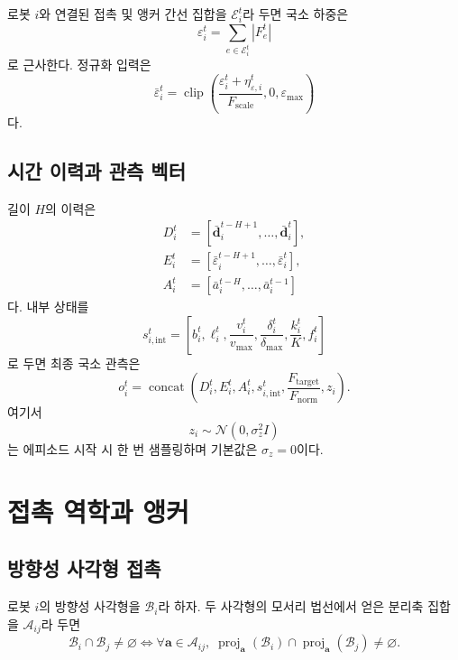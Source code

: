 \documentclass[11pt,a4paper]{article}
\newcommand{\Ftarget}{F_{\mathrm{target}}}
\newcommand{\clip}{\operatorname{clip}}
\newcommand{\concat}{\operatorname{concat}}
\begin{document}
로봇 \(i\)와 연결된 접촉 및 앵커 간선 집합을
\(\mathcal{E}_i^t\)라 두면 국소 하중은
\begin{equation}
  \varepsilon_i^t=
  \sum_{e\in\mathcal{E}_i^t}|F_e^t|
\end{equation}
로 근사한다. 정규화 입력은
\begin{equation}
  \bar\varepsilon_i^t=
  \clip\!\left(
    \frac{\varepsilon_i^t+\eta_{\varepsilon,i}^t}
         {F_{\mathrm{scale}}},
    0,\varepsilon_{\max}
  \right)
\end{equation}
다.

\subsection{시간 이력과 관측 벡터}

길이 \(H\)의 이력은
\begin{align}
  D_i^t &=
  [\bar{\bm d}_i^{t-H+1},\ldots,\bar{\bm d}_i^t],\\
  E_i^t &=
  [\bar\varepsilon_i^{t-H+1},\ldots,\bar\varepsilon_i^t],\\
  A_i^t &=
  [\bar a_i^{t-H},\ldots,\bar a_i^{t-1}]
\end{align}
다. 내부 상태를
\begin{equation}
  s_{i,\mathrm{int}}^t=
  \left[
    b_i^t,\ell_i^t,
    \frac{v_i^t}{v_{\max}},
    \frac{\delta_i^t}{\delta_{\max}},
    \frac{k_i^t}{K},
    f_i^t
  \right]
\end{equation}
로 두면 최종 국소 관측은
\begin{equation}
  o_i^t=
  \concat\!\left(
    D_i^t,E_i^t,A_i^t,
    s_{i,\mathrm{int}}^t,
    \frac{\Ftarget}{F_{\mathrm{norm}}},
    z_i
  \right).
  \label{eq:local-observation}
\end{equation}
여기서
\begin{equation}
  z_i\sim\mathcal{N}(0,\sigma_z^2I)
\end{equation}
는 에피소드 시작 시 한 번 샘플링하며 기본값은 \(\sigma_z=0\)이다.

\section{접촉 역학과 앵커}

\subsection{방향성 사각형 접촉}

로봇 \(i\)의 방향성 사각형을 \(\mathcal{B}_i\)라 하자. 두 사각형의 모서리 법선에서 얻은 분리축 집합을 \(\mathcal{A}_{ij}\)라 두면
\begin{equation}
  \mathcal{B}_i\cap\mathcal{B}_j\ne\varnothing
  \iff
  \forall\bm{a}\in\mathcal{A}_{ij},\;
  \operatorname{proj}_{\bm a}(\mathcal{B}_i)
  \cap
  \operatorname{proj}_{\bm a}(\mathcal{B}_j)
  \ne\varnothing.
\end{equation}
\end{document}
